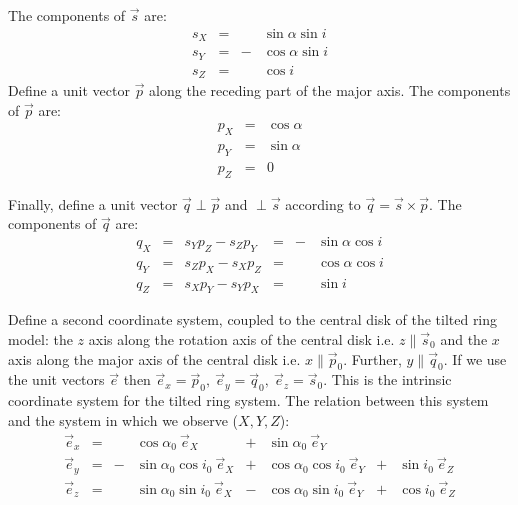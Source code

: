 \documentclass[11pt,a4paper]{article}
\begin{document}
The components of $ \vec s$ are:
\begin{equation}
\begin{array} {rccl}
s_X & = &   & \sin \alpha \sin i \nonumber\\
s_Y & = & - & \cos \alpha \sin i \\
s_Z & = &   & \cos i             \nonumber
\end{array}
\end{equation}
Define a unit vector $\vec p$ along the receding part of the major axis.
The components of $\vec p$ are:
\begin{equation}
\begin{array} {rcl}
p_X & = &  \cos \alpha \nonumber\\
p_Y & = &  \sin \alpha \\
p_Z & = &  0           \nonumber
\end{array}
\end{equation}
 
Finally, define a unit vector $ \vec q \perp \vec p$ and $ \perp \vec s$
according to $\vec q = \vec s \times \vec p$. The components of $\vec q$ are:
\begin{equation}
\begin{array}{rclccl}
q_X & = &  s_Y p_Z - s_Z p_Y & = & - & \sin \alpha \cos i  \nonumber\\
q_Y & = &  s_Z p_X - s_X p_Z & = &   & \cos \alpha \cos i  \\
q_Z & = &  s_X p_Y - s_Y p_X & = &   & \sin i              \nonumber
\end{array}
\end{equation}
 
Define a second coordinate system, coupled to the central disk
of the tilted ring model: the $z$ axis along the rotation axis of 
the central disk i.e. $z \parallel {\vec s}_0$ and the $x$ axis along
the major axis of the central disk i.e. $x \parallel {\vec p}_0$.
Further, $y \parallel{\vec q}_0$. If we use the unit vectors $\vec e$ then
$\vec e_x = \vec p_0, \: \vec e_y = \vec q_0, \: \vec e_z = \vec s_0$.
This is the intrinsic coordinate system for the tilted ring system.
The relation between this system and the system in which we observe ($X,Y,Z$):
\begin{equation}
\begin{array} {rcclclcl}
\vec e_x & = &   & \cos \alpha _0 \: \vec e_X
             & + & \sin \alpha _0 \: \vec e_Y
             &   &      \nonumber\\
\vec e_y & = & - & \sin \alpha _0 \cos i_0 \: \vec e_X
             & + & \cos \alpha _0 \cos i_0 \: \vec e_Y
             & + & \sin i_0 \: \vec e_Z   \\
\vec e_z & = &   & \sin \alpha _0 \sin i_0 \: \vec e_X
             & - & \cos \alpha _0 \sin i_0 \: \vec e_Y
             & + & \cos i_0 \: \vec e_Z   \nonumber \\
\end{array}
\end{equation}
\end{document}
